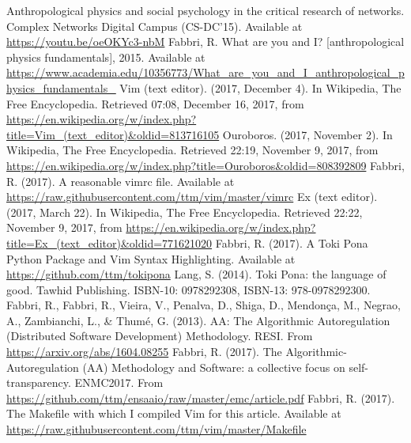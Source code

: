 \documentclass{article}
\begin{document}
\begin{thebibliography}{99}
\fontsize{11}{0}\selectfont
{}
	Anthropological physics and social psychology in the critical research of networks. Complex Networks Digital Campus (CS-DC'15).
	Available at \url{https://youtu.be/oeOKYc3-nbM}
	Fabbri, R. What are you and I? [anthropological physics fundamentals], 2015. Available at \url{https://www.academia.edu/10356773/What_are_you_and_I_anthropological_physics_fundamentals_}
  Vim (text editor). (2017, December 4). In Wikipedia, The Free
    Encyclopedia. Retrieved 07:08, December 16, 2017, from
    \url{https://en.wikipedia.org/w/index.php?title=Vim_(text_editor)&oldid=813716105}
  Ouroboros. (2017, November 2). In Wikipedia, The Free Encyclopedia. Retrieved 22:19, November 9, 2017, from \url{https://en.wikipedia.org/w/index.php?title=Ouroboros&oldid=808392809}
	Fabbri, R. (2017). A reasonable vimrc file. Available at \url{https://raw.githubusercontent.com/ttm/vim/master/vimrc} 
  Ex (text editor). (2017, March 22). In Wikipedia, The Free Encyclopedia. Retrieved 22:22, November 9, 2017, from \url{https://en.wikipedia.org/w/index.php?title=Ex_(text_editor)&oldid=771621020}
	Fabbri, R. (2017). A Toki Pona Python Package and Vim Syntax Highlighting. Available at \url{https://github.com/ttm/tokipona} 
	Lang, S. (2014). Toki Pona: the language of good. Tawhid Publishing.
    ISBN-10: 0978292308, ISBN-13: 978-0978292300.
	Fabbri, R., Fabbri, R., Vieira, V., Penalva, D., Shiga, D., Mendonça, M., Negrao, A., Zambianchi, L., \& Thumé, G. (2013). AA: The Algorithmic Autoregulation (Distributed Software Development) Methodology. RESI. From \url{https://arxiv.org/abs/1604.08255}
	Fabbri, R. (2017).
The Algorithmic-Autoregulation (AA) Methodology and Software:
a collective focus on self-transparency. ENMC2017. From \url{https://github.com/ttm/ensaaio/raw/master/emc/article.pdf} 
	Fabbri, R. (2017). The Makefile with which I compiled Vim for this article. Available at \url{https://raw.githubusercontent.com/ttm/vim/master/Makefile} 
\end{thebibliography}
\end{document}

